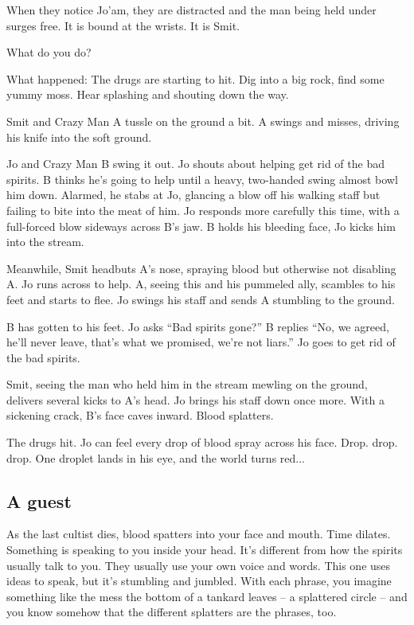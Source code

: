 \begin{multicols}{2}
When they notice Jo'am, they are distracted and the man being held under surges free.
It is bound at the wrists.
It is Smit.

What do you do?

\begin{aloud}
  What happened: The drugs are starting to hit.
  Dig into a big rock, find some yummy moss.
  Hear splashing and shouting down the way.

  Smit and Crazy Man A tussle on the ground a bit.
  A swings and misses, driving his knife into the soft ground.

  Jo and Crazy Man B swing it out.
  Jo shouts about helping get rid of the bad spirits.
  B thinks he's going to help until a heavy, two-handed swing almost bowl him down.
  Alarmed, he stabs at Jo, glancing a blow off his walking staff but failing to bite into the meat of him.
  Jo responds more carefully this time, with a full-forced blow sideways across B's jaw.
  B holds his bleeding face, Jo kicks him into the stream.

  Meanwhile, Smit headbuts A's nose, spraying blood but otherwise not disabling A.
  Jo runs across to help.
  A, seeing this and his pummeled ally, scambles to his feet and starts to flee.
  Jo swings his staff and sends A stumbling to the ground.

  B has gotten to his feet.
  Jo asks ``Bad spirits gone?''
  B replies ``No, we agreed, he'll never leave, that's what we promised, we're not liars.''
  Jo goes to get rid of the bad spirits.

  Smit, seeing the man who held him in the stream mewling on the ground, delivers several kicks
    to A's head.
  Jo brings his staff down once more.
  With a sickening crack, B's face caves inward.
  Blood splatters.

  The drugs hit.
  Jo can feel every drop of blood spray across his face.
  Drop.  drop.  drop.
  One droplet lands in his eye, and the world turns red...
\end{aloud}

  \subsection{A guest}
As the last cultist dies, blood spatters into your face and mouth.
Time dilates.
Something is speaking to you inside your head.
It's different from how the spirits usually talk to you.
They usually use your own voice and words.
This one uses ideas to speak, but it's stumbling and jumbled.
With each phrase, you imagine something like the mess the bottom of a tankard leaves --
  a splattered circle -- and you know somehow that the different splatters are the phrases, too.



\end{multicols}
